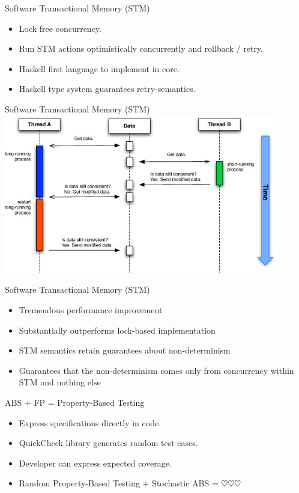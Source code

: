 \documentclass{beamer} %
\begin{document}
\begin{frame}{Software Transactional Memory (STM)}
  \begin{itemize}   	
  	\item Lock free concurrency.
  	\item Run STM actions optimistically concurrently and rollback / retry.
  	\item Haskell first language to implement in core.    
    \item Haskell type system guarantees retry-semantics.
  \end{itemize}
\end{frame}

\begin{frame}{Software Transactional Memory (STM)}
  \includegraphics[width=0.9\textwidth]{./fig/stm.png}
\end{frame}

\begin{frame}{Software Transactional Memory (STM)}
  \begin{itemize}
  	\item Tremendous performance improvement
    \item Substantially outperforms lock-based implementation 
    \item STM semantics retain guarantees about non-determinism
    \item Guarantees that the non-determinism comes only from concurrency within STM and nothing else
  \end{itemize}
\end{frame}

\begin{frame}{ABS + FP = Property-Based Testing}
  \begin{itemize}
    \item Express specifications directly in code.
    \item QuickCheck library generates random test-cases.
    \item Developer can express expected coverage.
    \item Random Property-Based Testing + Stochastic ABS = $\heartsuit \heartsuit \heartsuit$
  \end{itemize}
\end{frame}
\end{document}
